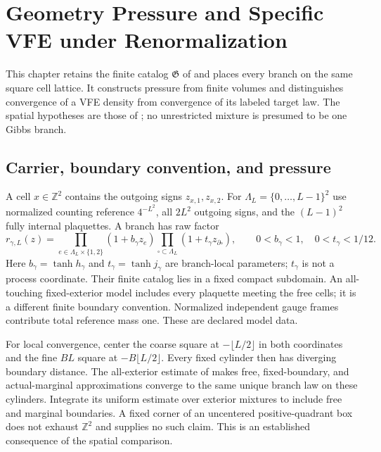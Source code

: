\chapter{Geometry Pressure and Specific VFE under Renormalization}
\label{ch:geometry-pressure}

This chapter retains the finite catalog $\mathfrak G$ of
 and places every branch on the same square
cell lattice. It constructs pressure from finite volumes and distinguishes
convergence of a VFE density from convergence of its labeled target law.
The spatial hypotheses are those of ;
no unrestricted mixture is presumed to be one Gibbs branch.

\section{Carrier, boundary convention, and pressure}
\label{sec:rg-pressure-carrier}

A cell $x\in\mathbb Z^2$ contains the outgoing signs $z_{x,1},z_{x,2}$.
For $\Lambda_L=\{0,\ldots,L-1\}^2$ use normalized counting reference
$4^{-L^2}$, all $2L^2$ outgoing signs, and the $(L-1)^2$ fully internal
plaquettes. A branch has raw factor
\begin{equation}
 r_{\gamma,L}(z)=\prod_{e\in\Lambda_L\times\{1,2\}}(1+b_\gamma z_e)
 \prod_{\square\subset\Lambda_L}(1+t_\gamma z_{\partial\square}),
 \qquad 0<b_\gamma<1,\quad 0<t_\gamma<1/12.
 \label{eq:rg-pressure-native-factor}
\end{equation}
Here $b_\gamma=\tanh h_\gamma$ and $t_\gamma=\tanh j_\gamma$ are
branch-local parameters; $t_\gamma$ is not a process coordinate. Their
finite catalog lies in a fixed compact subdomain. An all-touching
fixed-exterior model includes every plaquette meeting the free cells;
it is a different finite boundary convention. Normalized independent gauge
frames contribute total reference mass one. These are declared model data.

For local convergence, center the coarse square at
$-\lfloor L/2\rfloor$ in both coordinates and the fine $BL$ square at
$-B\lfloor L/2\rfloor$. Every fixed cylinder then has diverging boundary
distance. The all-exterior estimate of
 makes free, fixed-boundary,
and actual-marginal approximations converge to the same unique branch law
on these cylinders. Integrate its uniform estimate over exterior mixtures
to include free and marginal boundaries. A fixed corner of an uncentered
positive-quadrant box does not exhaust $\mathbb Z^2$ and supplies no such
claim. This is an established consequence of the spatial comparison.

